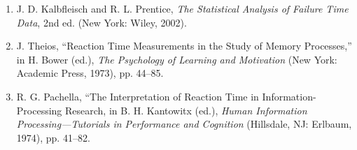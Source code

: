 \documentclass[
]{book}
\begin{document}
\begin{enumerate}
\item J. D. Kalbfleisch and R. L. Prentice, \textit{The Statistical Analysis of Failure Time Data}, 2nd ed. (New York: Wiley, 2002).
\item J. Theios, “Reaction Time Measurements in the Study of Memory Processes,” in H. Bower (ed.), \textit{The Psychology of Learning and Motivation} (New York: Academic Press, 1973), pp. 44–85.
\item R. G. Pachella, “The Interpretation of Reaction Time in Information-Processing Research, in B. H. Kantowitx (ed.), \textit{Human Information Processing—Tutorials in Performance and Cognition} (Hillsdale, NJ: Erlbaum, 1974), pp. 41–82.

\end{enumerate}

  
\end{document}
